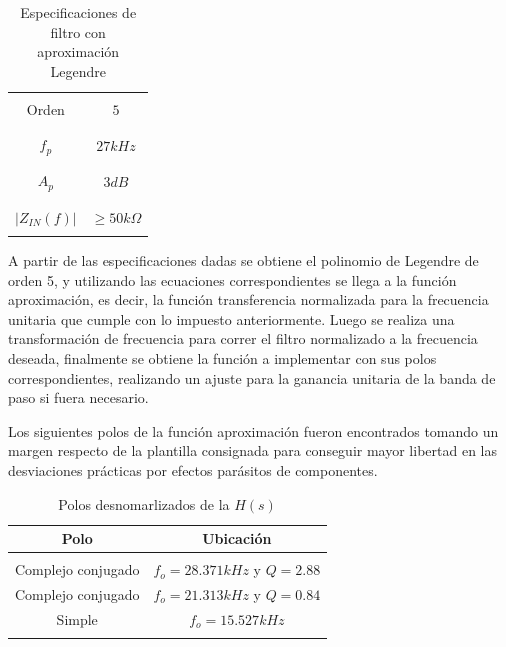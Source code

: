 \begin{table}[H]
	\centering
	\begin{tabular}{c | c}
		\hline \\
		Orden & $5$ \\
		\\ \hline \\
		$f_p$ & $27kHz$ \\
		\\ \hline \\
		$A_p$ & $3 dB$ \\
		\\ \hline \\
		$|Z_{IN}(f)|$ & $\geq 50k \Omega$ \\ 
		\\ \hline
	\end{tabular}
	\caption{Especificaciones de filtro con aproximaci\'on Legendre}
	\label{table:especificaciones_legendre}
\end{table}

A partir de las especificaciones dadas se obtiene el polinomio de Legendre de orden 5, y utilizando las ecuaciones correspondientes se llega a la funci\'on aproximaci\'on, es decir, la funci\'on
transferencia normalizada para la frecuencia unitaria que cumple con lo impuesto anteriormente. Luego se realiza una transformaci\'on de frecuencia para correr el filtro normalizado a la frecuencia deseada,
finalmente se obtiene la funci\'on a implementar con sus polos correspondientes, realizando un ajuste para la ganancia unitaria de la banda de paso si fuera necesario.

Los siguientes polos de la funci\'on aproximaci\'on fueron encontrados tomando un margen respecto de la plantilla consignada para conseguir mayor libertad en las desviaciones pr\'acticas por efectos par\'asitos de componentes.

\begin{table}[H]
	\centering
	\begin{tabular}{c | c}
		Polo & Ubicaci\'on \\
		\hline \\
		Complejo conjugado & $f_o = 28.371kHz$ y $Q = 2.88$ \\
		Complejo conjugado & $f_o = 21.313kHz$ y $Q = 0.84$\\
		Simple & $f_o = 15.527kHz$\\
		\\ \hline
	\end{tabular}
	\caption{Polos desnomarlizados de la $H(s)$}
\end{table}

